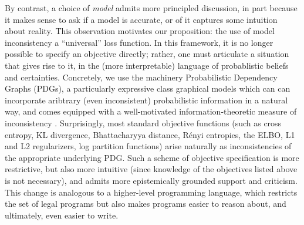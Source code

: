 \documentclass{article}
\theoremstyle{plain}
\theoremstyle{definition}
\begin{document}
By contrast, a choice of \emph{model} admits more principled discussion, in part because it makes sense to ask if a model is accurate, or of it captures some intuition about reality.
This observation motivates our proposition: the use of model inconsistency a ``universal'' loss function. In this framework, it is no longer possible to specify an objective directly; rather, one must articulate a situation that gives rise to it, in the (more interpretable) language of probablistic beliefs and certainties. %
Concretely, we use the machinery Probabilistic Dependency Graphs (PDGs), a particularly expressive class graphical models which can can incorporate aribtrary (even inconsistent) probabilistic information in a natural way, and comes equipped with a well-motivated information-theoretic measure of inconsistency  \cite{richardson2020probabilistic}.
Surprisingly, most standard objective functions (such as cross entropy, KL divergence, Bhattacharyya distance, R\'enyi entropies, the ELBO, L1 and L2 regularizers, log partition functions) arise naturally as inconsistencies of the appropriate underlying PDG.
Such a scheme of objective specification is more restrictive, but also more intuitive (since knowledge of the objectives listed above is not necessary), and admits more epistemically grounded support and criticism.
This change is analogous to a higher-level programming language, which restricts the set of legal programs but also makes programs easier to reason about, and ultimately,  even easier to write.


\end{document}
